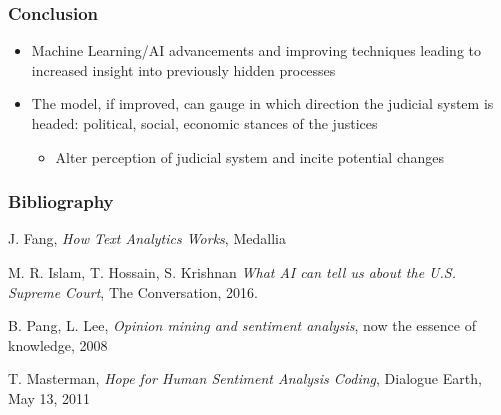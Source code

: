 \documentclass{beamer}
\begin{document}
	
\begin{frame}
\frametitle{Conclusion}

\begin{itemize}	
	\item Machine Learning/AI advancements and improving techniques leading to increased insight into previously hidden processes
	\item The model, if improved, can gauge in which direction the judicial system is headed: political, social, economic stances of the justices
		\begin{itemize}
			\item Alter perception of judicial system and incite potential changes
		\end{itemize}
\end{itemize}


\end{frame}




\begin{frame}
\frametitle{Bibliography}
\footnotesize{
\begin{thebibliography}{9}

 J. Fang, \emph{How Text Analytics Works},  Medallia

M. R. Islam, T. Hossain, S. Krishnan \emph{What AI can tell us about the U.S. Supreme Court}, The Conversation, 2016.

 B. Pang, L. Lee, \emph{Opinion mining and sentiment analysis}, now the essence of knowledge, 2008

 T. Masterman, \emph{Hope for Human Sentiment Analysis Coding},  Dialogue Earth, May 13, 2011



\end{thebibliography}

}
\end{frame}


\end{document}
